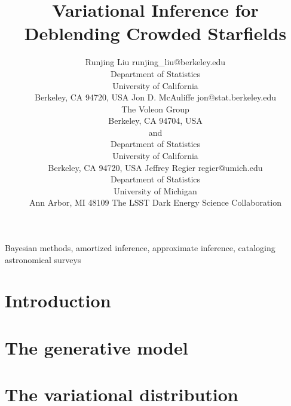 \documentclass[twoside,11pt]{article}
\begin{document}
\title{Variational Inference for Deblending Crowded Starfields}

\author{\name Runjing Liu
    \email runjing\_liu@berkeley.edu \\
    \addr Department of Statistics\\
    University of California\\
    Berkeley, CA 94720, USA
    \AND
    \name Jon D. McAuliffe
    \email jon@stat.berkeley.edu \\
    \addr
    The Voleon Group \\
    Berkeley, CA 94704, USA \\
    and\\
    Department of Statistics\\
    University of California\\
    Berkeley, CA 94720, USA
    \AND
    \name Jeffrey Regier
    \email regier@umich.edu \\
    \addr
    Department of Statistics \\
    University of Michigan \\
    Ann Arbor, MI 48109
    \AND
    \name The LSST Dark Energy Science Collaboration
    }

\editor{}

\maketitle

\begin{abstract}%

\end{abstract}

\begin{keywords}
  Bayesian methods, amortized inference, approximate inference, cataloging astronomical surveys
\end{keywords}

\section{Introduction}
\label{sec:intro}


\section{The generative model}
\label{sec:gen_model}


\section{The variational distribution}
\label{sec:var_inference}

\end{document}
